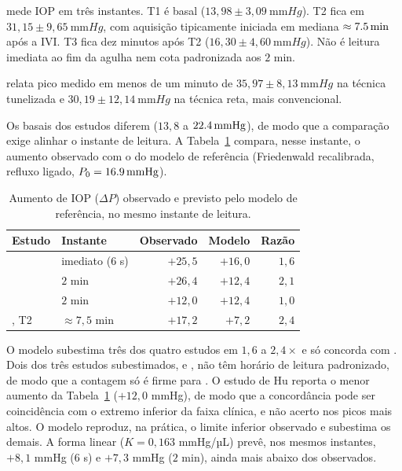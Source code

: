 \citet{papazoglou2026} mede IOP em três instantes. T1 é basal ($13{,}98\pm3{,}09\ \unit{\milli\meter Hg}$). T2 fica em $31{,}15\pm9{,}65\ \unit{\milli\meter Hg}$, com aquisição tipicamente iniciada em mediana $\approx\SI{7{,}5}{\minute}$ após a IVI. T3 fica dez minutos após T2 ($16{,}30\pm4{,}60\ \unit{\milli\meter Hg}$). Não é leitura imediata ao fim da agulha nem cota padronizada aos $2$ min.
 
\citet{knecht2009} relata pico medido em menos de um minuto de $35{,}97\pm8{,}13\ \unit{\milli\meter Hg}$ na técnica tunelizada e $30{,}19\pm12{,}14\ \unit{\milli\meter Hg}$ na técnica reta, mais convencional.

Os basais dos estudos diferem ($13{,}8$ a $\SI{22{,}4}{\milli\meter Hg}$), de modo que a comparação exige alinhar o instante de leitura. A Tabela~\ref{tab:camada2_alinhada} compara, nesse instante, o aumento observado com o do modelo de referência (Friedenwald recalibrada, refluxo ligado, $P_0=\SI{16{,}9}{\milli\meter Hg}$).

\begin{table}[htbp]
\centering
\caption{Aumento de IOP ($\Delta P$) observado e previsto pelo modelo de referência, no mesmo instante de leitura.}
\label{tab:camada2_alinhada}
\small
\begin{tabular}{llrrr}
\toprule
Estudo & Instante & Observado & Modelo & Razão \\
\midrule
\citet{sharei2010} & imediato ($6$ s) & $+25{,}5$ & $+16{,}0$ & $1{,}6$ \\
\citet{soheilian2017} & $2$ min & $+26{,}4$ & $+12{,}4$ & $2{,}1$ \\
\citet{hu2022conbercept} & $2$ min & $+12{,}0$ & $+12{,}4$ & $1{,}0$ \\
\citet{papazoglou2026}, T2 & $\approx7{,}5$ min & $+17{,}2$ & $+7{,}2$ & $2{,}4$ \\
\bottomrule
\end{tabular}
\end{table}

O modelo subestima três dos quatro estudos em $1{,}6$ a $2{,}4\times$ e só concorda com \citet{hu2022conbercept}. Dois dos três estudos subestimados, \citet{sharei2010} e \citet{papazoglou2026}, não têm horário de leitura padronizado, de modo que a contagem só é firme para \citet{soheilian2017}. O estudo de Hu reporta o menor aumento da Tabela~\ref{tab:camada2_alinhada} ($+12{,}0$ mmHg), de modo que a concordância pode ser coincidência com o extremo inferior da faixa clínica, e não acerto nos picos mais altos. O modelo reproduz, na prática, o limite inferior observado e subestima os demais. A forma linear ($K=0{,}163$ mmHg/µL) prevê, nos mesmos instantes, $+8{,}1$ mmHg ($6$ s) e $+7{,}3$ mmHg ($2$ min), ainda mais abaixo dos observados.


